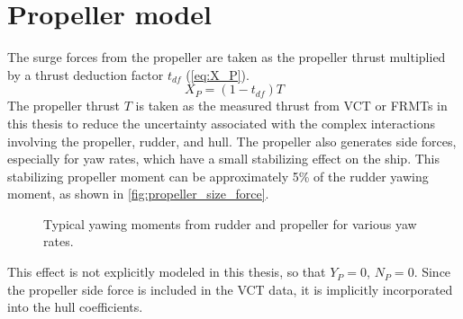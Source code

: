 \section{Propeller model} \label{sec:propeller}
The surge forces from the propeller are taken as the propeller thrust multiplied by a thrust deduction factor $t_{df}$ (\autoref{eq:X_P}).
\begin{equation}
    \label{eq:X_P}
    X_P = (1-t_{df})T
\end{equation}
The propeller thrust $T$ is taken as the measured thrust from VCT or FRMTs in this thesis to reduce the uncertainty associated with the complex interactions involving the propeller, rudder, and hull. The propeller also generates side forces, especially for yaw rates, which have a small stabilizing effect on the ship. This stabilizing propeller moment can be approximately 5\% of the rudder yawing moment, as shown in \autoref{fig:propeller_size_force}.
\begin{figure}[h]
    \centering
    

    \begin{minipage}[t]{5.25in}
    \caption{Typical yawing moments from rudder and propeller for various yaw rates.}
	\label{fig:propeller_size_force}
    \end{minipage}
        
\end{figure}
This effect is not explicitly modeled in this thesis, so that $Y_P=0$, $N_P=0$. Since the propeller side force is included in the VCT data, it is implicitly incorporated into the hull coefficients.
